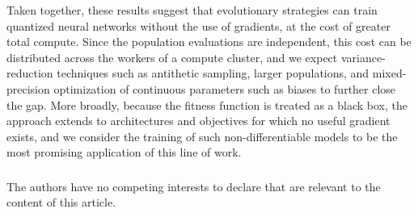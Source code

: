 \documentclass[runningheads]{llncs}
\begin{document}
Taken together, these results suggest that evolutionary strategies can train quantized neural networks without the use of gradients, at the cost of greater total compute.
Since the population evaluations are independent, this cost can be
distributed across the workers of a compute cluster, and we expect
variance-reduction techniques such as antithetic sampling, larger
populations, and mixed-precision optimization of continuous parameters
such as biases to further close the gap. More broadly, because the
fitness function is treated as a black box, the approach extends to
architectures and objectives for which no useful gradient exists, and we
consider the training of such non-differentiable models to be the most
promising application of this line of work.

\begin{credits}

\subsubsection{\discintname}
The authors have no competing interests to declare that are relevant to the
content of this article.
\end{credits}



\end{document}
